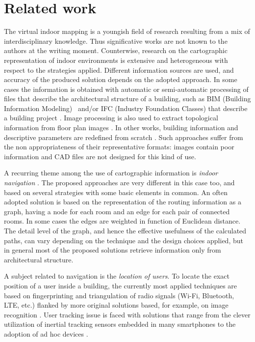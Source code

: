 \section{Related work}\label{related-work}

The virtual indoor mapping is a youngish field of research resulting from a mix of interdisciplinary knowledge. Thus significative works are not known to the authors at the writing moment. Counterwise, research on the cartographic representation of indoor environments is
extensive and heterogeneous with respect to the strategies
applied. Different information sources are used, and accuracy of the
produced solution depends on the adopted approach. In some cases the
information is obtained with automatic or semi-automatic processing of files
that describe the architectural structure of a building, such as BIM (Building Information Modeling)~\cite{Eastman:2008:BHG:1796500} and/or IFC (Industry Foundation Classes) that describe a building project \cite{6816739}. Image processing is also used to
extract topological information from floor plan images \cite{6878152}. In
other works, building information and descriptive parameters are redefined
from scratch \cite{6418876}. Such approaches suffer from the non appropriateness of
their representative formats: images contain poor information and CAD
files are not designed for this kind of use. 

A recurring theme among the use
of cartographic information is \emph{indoor navigation}
\cite{6878152,6418876,6816739}. The proposed approaches are very different in
this case too, and based on several strategies with some basic elements in
common. An often adopted solution is based on the representation of the
routing information as a graph, having a node for each room and an edge for
each pair of connected rooms. In some cases the edges are weighted in
function of Euclidean distance. The detail level of the graph, and hence the
effective usefulness of the calculated paths, can vary depending on the
technique and the design choices applied, but in general most of the proposed
solutions retrieve information only from architectural structure. 

A subject related to navigation is the \emph{location of users}. To locate the exact position of a user inside a
building, the currently most applied techniques are based on fingerprinting and
triangulation of radio signals (Wi-Fi, Bluetooth, LTE, etc.) flanked by more
original solutions based, for example, on image recognition \cite{6815564}.
User tracking issue is faced with solutions that range from the clever
utilization of inertial tracking sensors embedded in many smartphones
\cite{6815564} to the adoption of ad hoc devices \cite{6878152}.

